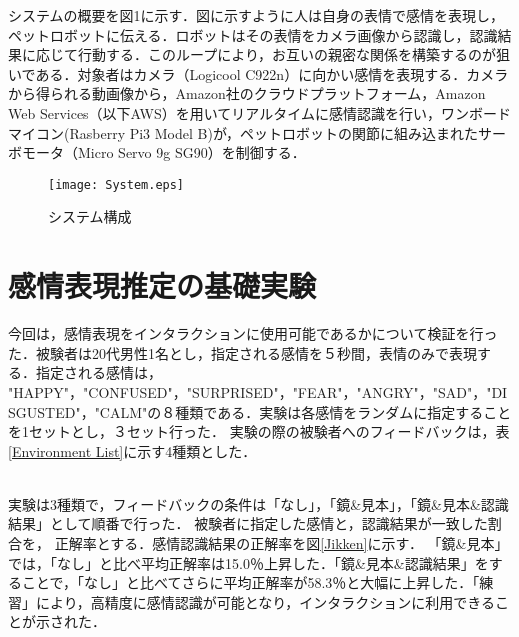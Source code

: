 \documentclass[twocolumn,a4j]{jarticle}
\begin{document}
システムの概要を図1に示す．図に示すように人は自身の表情で感情を表現し，ペットロボットに伝える．ロボットはその表情をカメラ画像から認識し，認識結果に応じて行動する．このループにより，お互いの親密な関係を構築するのが狙いである．対象者はカメラ（Logicool C922n）に向かい感情を表現する．カメラから得られる動画像から，Amazon社のクラウドプラットフォーム，Amazon Web Services（以下AWS）を用いてリアルタイムに感情認識を行い，ワンボードマイコン(Rasberry Pi3 Model B)が，ペットロボットの関節に組み込まれたサーボモータ（Micro Servo 9g SG90）を制御する． 

\begin{figure}[h]
\begin{center}
\texttt{[image: System.eps]}
\end{center}
\vspace{-5mm}
\caption{システム構成}
\label{System} %
\end{figure}
\vspace{-10mm}
\section{感情表現推定の基礎実験}
 今回は，感情表現をインタラクションに使用可能であるかについて検証を行った．被験者は20代男性1名とし，指定される感情を５秒間，表情のみで表現する．指定される感情は， "HAPPY"，"CONFUSED"，"SURPRISED"，"FEAR"，"ANGRY"，"SAD"，"DISGUSTED"，"CALM"の８種類である．実験は各感情をランダムに指定することを1セットとし，３セット行った．
 実験の際の被験者へのフィードバックは，表\ref{Environment List}に示す4種類とした．

 \\実験は3種類で，フィードバックの条件は「なし」，「鏡\&見本」，「鏡\&見本\&認識結果」として順番で行った．
 被験者に指定した感情と，認識結果が一致した割合を， 正解率とする．感情認識結果の正解率を図\ref{Jikken}に示す．
 「鏡\&見本」では，「なし」と比べ平均正解率は15.0$％$上昇した．「鏡\&見本\&認識結果」をすることで，「なし」と比べてさらに平均正解率が58.3$％$と大幅に上昇した．「練習」により，高精度に感情認識が可能となり，インタラクションに利用できることが示された．
\end{document}

